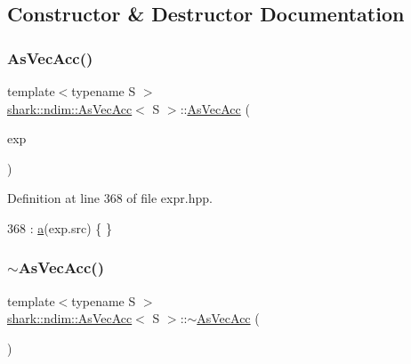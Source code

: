 \subsection{Constructor \& Destructor Documentation}
\hypertarget{classshark_1_1ndim_1_1_as_vec_acc_3_01_s_01_4_abd3241939a3644771432342c0557b5a0}{}\label{classshark_1_1ndim_1_1_as_vec_acc_3_01_s_01_4_abd3241939a3644771432342c0557b5a0} 
\subsubsection{\texorpdfstring{As\+Vec\+Acc()}{AsVecAcc()}}
{\footnotesize\ttfamily template$<$typename S $>$ \\
\hyperlink{classshark_1_1ndim_1_1_as_vec_acc}{shark\+::ndim\+::\+As\+Vec\+Acc}$<$ S $>$\+::\hyperlink{classshark_1_1ndim_1_1_as_vec_acc}{As\+Vec\+Acc} (\begin{DoxyParamCaption}\item[{const \hyperlink{classshark_1_1ndim_1_1_as_vec_exp}{As\+Vec\+Exp}$<$ S $>$ \&}]{exp }\end{DoxyParamCaption})}



Definition at line 368 of file expr.\+hpp.


\begin{DoxyCode}
368 : \hyperlink{classshark_1_1ndim_1_1_as_vec_acc_3_01_s_01_4_a9145bd6eafb611f2d6fd285fe5e99f98}{a}(exp.src) \{ \}
\end{DoxyCode}
\hypertarget{classshark_1_1ndim_1_1_as_vec_acc_3_01_s_01_4_a97242ac29d3d50ddbcd8e811f479f61e}{}\label{classshark_1_1ndim_1_1_as_vec_acc_3_01_s_01_4_a97242ac29d3d50ddbcd8e811f479f61e} 
\subsubsection{\texorpdfstring{$\sim$\+As\+Vec\+Acc()}{~AsVecAcc()}}
{\footnotesize\ttfamily template$<$typename S $>$ \\
\hyperlink{classshark_1_1ndim_1_1_as_vec_acc}{shark\+::ndim\+::\+As\+Vec\+Acc}$<$ S $>$\+::$\sim$\hyperlink{classshark_1_1ndim_1_1_as_vec_acc}{As\+Vec\+Acc} (\begin{DoxyParamCaption}{ }\end{DoxyParamCaption})}



